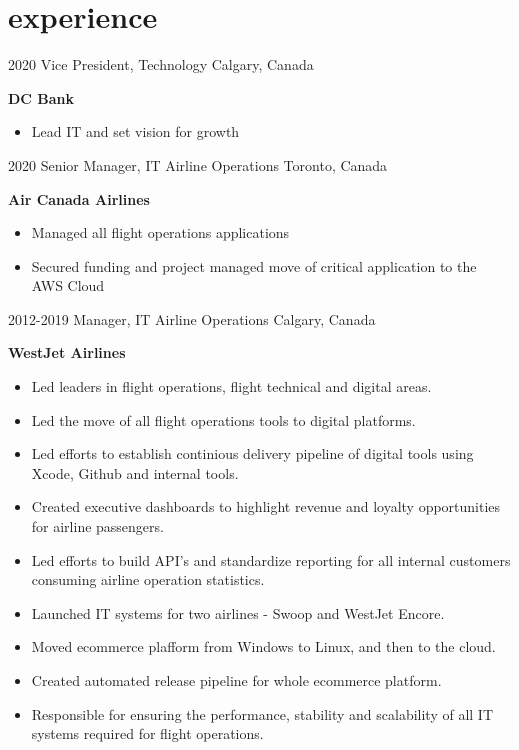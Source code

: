 \section{experience}

\begin{entrylist}
  \entry
    {2020}
    {Vice President, Technology}
    {Calgary, Canada}
    {
      \textbf{DC Bank}
      \begin{itemize}
        \item Lead IT and set vision for growth 
      \end{itemize}
    }
  \entry
  \entry
    {2020}
    {Senior Manager, IT Airline Operations}
    {Toronto, Canada}
    {
      \textbf{Air Canada Airlines}
      \begin{itemize}
        \item Managed all flight operations applications 
	\item Secured funding and project managed move of critical application to the AWS Cloud 
      \end{itemize}
    }
  \entry
    {2012-2019}
    {Manager, IT Airline Operations}
    {Calgary, Canada}
    {
      \textbf{WestJet Airlines}
      \begin{itemize}
        \item Led leaders in flight operations, flight technical and digital areas. 
        \item Led the move of all flight operations tools to digital platforms.
        \item Led efforts to establish continious delivery pipeline of digital tools using Xcode, Github and internal tools. 
        \item Created executive dashboards to highlight revenue and loyalty opportunities for airline passengers.  
        \item Led efforts to build API's and standardize reporting for all internal customers consuming airline operation statistics. 
        \item Launched IT systems for two airlines - Swoop and WestJet Encore.
        \item Moved ecommerce plafform from Windows to Linux, and then to the cloud.
        \item Created automated release pipeline for whole ecommerce platform. 
        \item Responsible for ensuring the performance, stability and scalability of all IT systems required for flight operations. 

\end{itemize}}
\end{entrylist}
